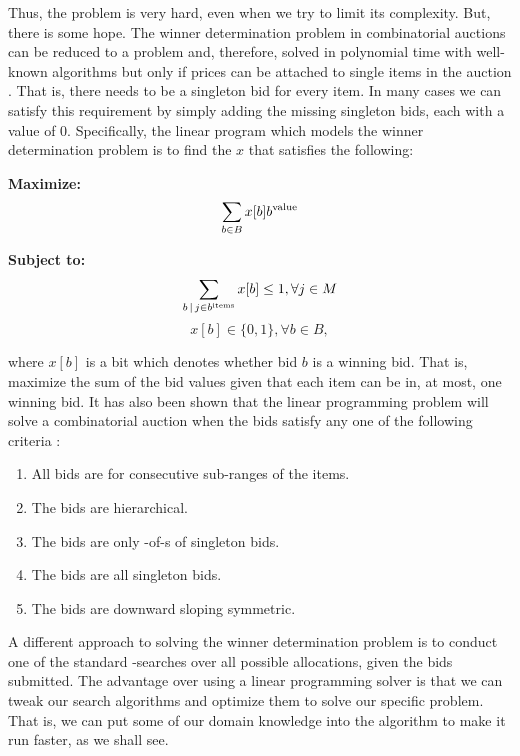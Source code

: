 Thus, the problem is very hard, even when we try to limit its
complexity. But, there is some hope. The winner determination problem
in combinatorial auctions can be reduced to a 
problem and, therefore, solved in polynomial time with well-known
algorithms but only if prices can be attached to single items in the
auction \cite{nisan00a}. That is, there needs to be a singleton bid
for every item. In many cases we can satisfy this requirement by
simply adding the missing singleton bids, each with a value of 0.
Specifically, the linear program which models the winner determination
problem is to find the $x$ that satisfies the following:

\textbf{Maximize:}
\[\sum_{b \in B} x[b] b^{\text{value}}\]

\textbf{Subject to:}
\[\sum_{b \,|\, j \in b^{\text{items}}} x[b] \leq 1, \forall j \in M\]
\[x[b] \in \{0,1\}, \forall b \in B,\]

where $x[b]$ is a bit which denotes whether bid $b$ is a winning bid.
That is, maximize the sum of the bid values given that each item can
be in, at most, one winning bid.  It has also been shown that the
linear programming problem will solve a combinatorial auction when the
bids satisfy any one of the following criteria \cite{nisan00a}:
\begin{enumerate}
\item All bids are for consecutive sub-ranges of the items.
\item The bids are hierarchical.
\item The bids are only -of-s of singleton bids.
\item The bids are all singleton bids.
\item The bids are downward sloping symmetric.
\end{enumerate}

\medskip

A different approach to solving the winner determination problem is to
conduct one of the standard -searches over all possible
allocations, given the bids submitted. The advantage over using a
linear programming solver is that we can tweak our  search
algorithms and optimize them to solve our specific problem. That is,
we can put some of our domain knowledge into the algorithm to make it
run faster, as we shall see.


